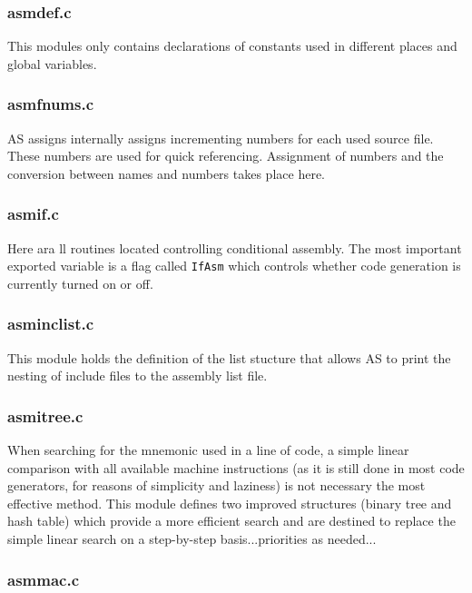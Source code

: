 \documentclass[12pt,twoside]{report}
\newcommand{\tty}[1]{{\tt #1}}
\newcommand{\asname}{{AS}}
\begin{document}
\subsubsection{asmdef.c}

This modules only contains declarations of constants used in different
places and global variables.

\subsubsection{asmfnums.c}

\asname{} assigns internally assigns incrementing numbers for each used source
file.  These numbers are used for quick referencing.  Assignment of
numbers and the conversion between names and numbers takes place here.

\subsubsection{asmif.c}

Here ara ll routines located controlling conditional assembly.  The most
important exported variable is a flag called \tty{IfAsm} which controls
whether code generation is currently turned on or off.

\subsubsection{asminclist.c}

This module holds the definition of the list stucture that allows \asname{} to
print the nesting of include files to the assembly list file.

\subsubsection{asmitree.c}

When searching for the mnemonic used in a line of code, a simple linear
comparison with all available machine instructions (as it is still done in
most code generators, for reasons of simplicity and laziness) is not
necessary the most effective method.  This module defines two improved
structures (binary tree and hash table) which provide a more efficient
search and are destined to replace the simple linear search on a
step-by-step basis...priorities as needed...

\subsubsection{asmmac.c}
\end{document}
